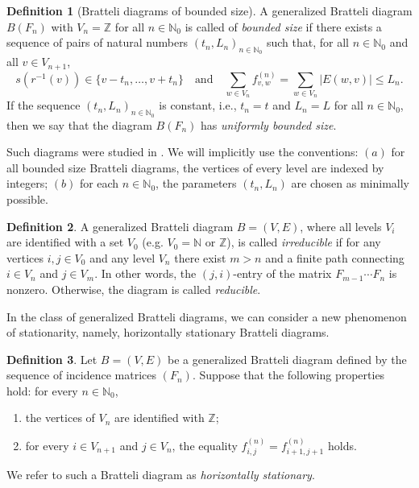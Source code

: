 \documentclass[11pt,reqno]{amsart}
\theoremstyle{definition}
\newtheorem{definition}{Definition}[section]
\theoremstyle{remark}
\theoremstyle{plain}
\newcommand{\N}{\mathbb N}
\newcommand{\Z}{\mathbb Z}
\numberwithin{equation}{section}
\begin{document}
\begin{definition}[Bratteli diagrams of bounded size]
\label{Def:BD_bdd_size} A generalized Bratteli 
diagram $B(F_n)$ with $V_n = \mathbb{Z}$ for all $n \in \N_0$ is called of \textit{bounded size} if there exists 
a sequence of pairs of natural numbers $(t_n, L_n)_{n \in \N_0}$ 
such that, for all $n \in \mathbb{N}_0$ and all $v \in V_{n+1}$,
\begin{equation}\label{eq: Bndd size}
s(r^{-1}(v)) \in \{v - t_n, \ldots, v + t_n\} \quad \mbox{and} 
\quad \sum_{w \in V_{n}} f^{(n)}_{v,w} = \sum_{w \in V_{n}} |E(w,v)| 
\leq L_n.
\end{equation} 
If the sequence $(t_n, L_n)_{n \in \N_0}$ is constant, i.e., $t_n = t$ and $L_n = L$ for all $n \in \N_0$, then we say that the 
diagram $B(F_n)$ has \textit{uniformly bounded size}. 
\end{definition}
Such diagrams were studied in 
\cite[Section 3]{BezuglyiJorgensenKarpelSanadhya2025}. We will implicitly use the conventions: $(a)$ for all bounded size Bratteli diagrams, the vertices of every level are indexed by integers; $(b)$ for each $n \in \N_0$, the parameters $(t_n, L_n)$ are chosen as minimally possible.

\begin{definition}\label{Def:irreducible_GBD} 
A generalized Bratteli diagram $B =(V,E)$, where all levels $V_i$ are identified with a set $V_0$ (e.g. $V_0 = 
\mathbb{N}$ or $\mathbb{Z}$),  is called  \textit{irreducible} if 
for any vertices $i, j \in V_0$ and any level $V_n$ there exist
$m > n$ and a finite path connecting $i \in V_n$ and $j \in V_m$. In 
other words, the $(j, i)$-entry of the matrix $F_{m-1} \cdots 
F_n$ 
is nonzero. Otherwise, the diagram is called \textit{reducible}.

\end{definition}

In the class of generalized Bratteli diagrams, we can consider a new phenomenon of stationarity, namely, horizontally stationary Bratteli diagrams.

\begin{definition}\label{Def: Horz}
 Let $B = (V, E)$ be a generalized Bratteli diagram defined by the
 sequence of incidence matrices $(F_n)$. Suppose that the following properties hold: for every $n\in \N_0$, 
\begin{enumerate}[label=(\roman*)]
    \item the vertices of $V_n$ are identified with $\Z$;
    
    \item for every $i \in V_{n+1}$ and $j \in V_n$, the equality
$f_{i,j}^{(n)} = f_{i+1,j+1}^{(n)}$ holds.
\end{enumerate}
\noindent
We refer to such a Bratteli diagram as \textit{horizontally stationary}.
\end{definition} 
\end{document}
